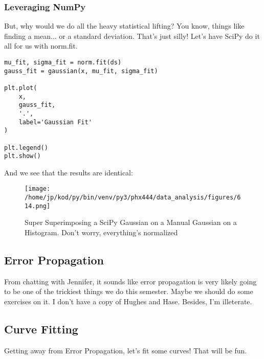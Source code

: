 \documentclass{article}
\begin{document}
\subsubsection{Leveraging NumPy}
But, why would we do all the heavy statistical lifting? You know, things like
finding a mean... or a standard deviation. That's just silly! Let's have SciPy
do it all for us with norm.fit.

\begin{center}
\begin{minipage}[t]{.75\textwidth}
\begin{lstlisting}[frame=tlrb]
mu_fit, sigma_fit = norm.fit(ds)
gauss_fit = gaussian(x, mu_fit, sigma_fit)

plt.plot(
    x,
    gauss_fit,
    '.',
    label='Gaussian Fit'
)

plt.legend()
plt.show()

\end{lstlisting}
\end{minipage}
\end{center}

And we see that the results are identical:
\begin{figure}[H]
        \begin{center}
        \texttt{[image: /home/jp/kod/py/bin/venv/py3/phx444/data\_analysis/figures/614.png]}
        \caption{Super Superimposing a SciPy Gaussian on a Manual Gaussian on a
            Histogram. Don't worry, everything's normalized}
        \label{fig:fig_16}
        \end{center}
\end{figure}

\subsection{Error Propagation}
From chatting with Jennifer, it sounds like error propagation is very likely
going to be one of the trickiest things we do this semester. Maybe we should do
some exercises on it. I don't have a copy of Hughes and Hase. Besides, I'm
illeterate.

\subsection{Curve Fitting}
Getting away from Error Propagation, let's fit some curves! That will be fun.
\end{document}

